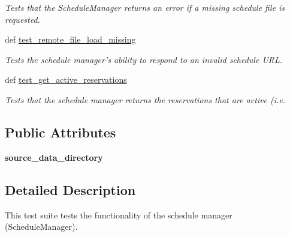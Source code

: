 \begin{DoxyCompactItemize}
\begin{DoxyCompactList}\small\item\em Tests that the Schedule\-Manager returns an error if a missing schedule file is requested. \end{DoxyCompactList}\item 
\hypertarget{classhwm_1_1sessions_1_1tests_1_1test__schedule_1_1_test_schedule_aad883af594f5058a04fb1b6bc2dd5d9a}{def \hyperlink{classhwm_1_1sessions_1_1tests_1_1test__schedule_1_1_test_schedule_aad883af594f5058a04fb1b6bc2dd5d9a}{test\-\_\-remote\-\_\-file\-\_\-load\-\_\-missing}}\label{classhwm_1_1sessions_1_1tests_1_1test__schedule_1_1_test_schedule_aad883af594f5058a04fb1b6bc2dd5d9a}

\begin{DoxyCompactList}\small\item\em Tests the schedule manager's ability to respond to an invalid schedule U\-R\-L. \end{DoxyCompactList}\item 
def \hyperlink{classhwm_1_1sessions_1_1tests_1_1test__schedule_1_1_test_schedule_ab2481441aa193770ce6812e1728e4b77}{test\-\_\-get\-\_\-active\-\_\-reservations}
\begin{DoxyCompactList}\small\item\em Tests that the schedule manager returns the reservations that are active (i.\-e. \end{DoxyCompactList}\end{DoxyCompactItemize}
\subsection*{Public Attributes}
\begin{DoxyCompactItemize}
\item 
\hypertarget{classhwm_1_1sessions_1_1tests_1_1test__schedule_1_1_test_schedule_a6d48e1aaf3b1e1267e8a69b1e23b104b}{{\bfseries source\-\_\-data\-\_\-directory}}\label{classhwm_1_1sessions_1_1tests_1_1test__schedule_1_1_test_schedule_a6d48e1aaf3b1e1267e8a69b1e23b104b}

\end{DoxyCompactItemize}


\subsection{Detailed Description}
This test suite tests the functionality of the schedule manager (Schedule\-Manager). 

